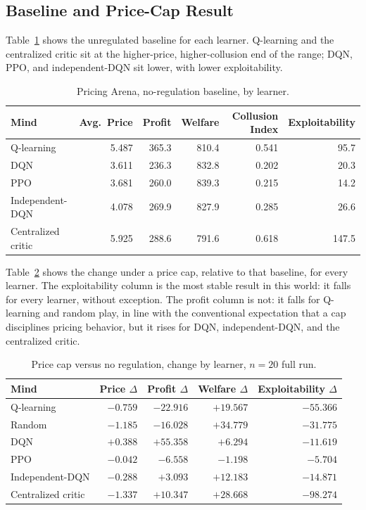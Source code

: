 \documentclass[11pt]{article}
\begin{document}
\subsection{Baseline and Price-Cap Result}

Table~\ref{tab:pricing-baseline} shows the unregulated baseline for each
learner. Q-learning and the centralized critic sit at the higher-price,
higher-collusion end of the range; DQN, PPO, and independent-DQN sit lower,
with lower exploitability.

\begin{table}[h]
\centering
\begin{tabular}{lrrrrr}
\toprule
Mind & Avg.\ Price & Profit & Welfare & Collusion Index & Exploitability \\
\midrule
Q-learning & 5.487 & 365.3 & 810.4 & 0.541 & 95.7 \\
DQN & 3.611 & 236.3 & 832.8 & 0.202 & 20.3 \\
PPO & 3.681 & 260.0 & 839.3 & 0.215 & 14.2 \\
Independent-DQN & 4.078 & 269.9 & 827.9 & 0.285 & 26.6 \\
Centralized critic & 5.925 & 288.6 & 791.6 & 0.618 & 147.5 \\
\bottomrule
\end{tabular}
\caption{Pricing Arena, no-regulation baseline, by learner.}
\label{tab:pricing-baseline}
\end{table}

Table~\ref{tab:pricing-cap-full} shows the change under a price cap, relative
to that baseline, for every learner. The exploitability column is the most stable
result in this world: it falls for every learner, without exception. The profit
column is not: it falls for Q-learning and random play, in line with the
conventional expectation that a cap disciplines pricing behavior, but it rises
for DQN, independent-DQN, and the centralized critic.

\begin{table}[h]
\centering
\begin{tabular}{lrrrr}
\toprule
Mind & Price \(\Delta\) & Profit \(\Delta\) & Welfare \(\Delta\) & Exploitability \(\Delta\) \\
\midrule
Q-learning & \(-0.759\) & \(-22.916\) & \(+19.567\) & \(-55.366\) \\
Random & \(-1.185\) & \(-16.028\) & \(+34.779\) & \(-31.775\) \\
DQN & \(+0.388\) & \(+55.358\) & \(+6.294\) & \(-11.619\) \\
PPO & \(-0.042\) & \(-6.558\) & \(-1.198\) & \(-5.704\) \\
Independent-DQN & \(-0.288\) & \(+3.093\) & \(+12.183\) & \(-14.871\) \\
Centralized critic & \(-1.337\) & \(+10.347\) & \(+28.668\) & \(-98.274\) \\
\bottomrule
\end{tabular}
\caption{Price cap versus no regulation, change by learner, \(n=20\) full run.}
\label{tab:pricing-cap-full}
\end{table}
\end{document}
